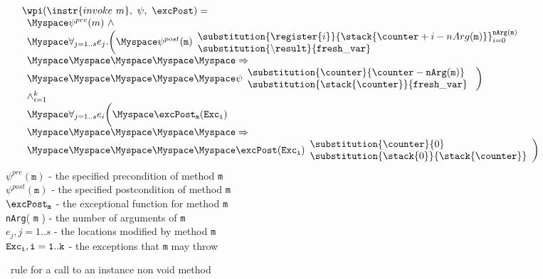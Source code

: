 \begin{figure}[!ht]
$$
\begin{array}{l}
\wpi(\instr{invoke \  m}, \ \psi ,\ \excPost) =\\ 
\begin{array}{l}
\Myspace \psi^{pre}(m) \ \wedge \\
\Myspace  \forall_{j = 1..s} e_{j}.\biggl( 
\Myspace \psi^{post}( \texttt{m}) 
                     \begin{array}{l}
                     \substitution{\register{i}}{\stack{\counter+i-nArg(\texttt{m}) }}_{i=0}^{\tt{nArg(m)}}  \\
                      \substitution{\tt{\backslash result} }{ fresh\_var } \\
                     \end{array} \\
  \Myspace\Myspace\Myspace\Myspace\Myspace                    \Rightarrow  \\
\Myspace\Myspace\Myspace\Myspace\Myspace   \psi  \begin{array}{l}
                             \substitution{\counter }{\counter - \tt{nArg}( \texttt{m} )} \\
                             \substitution{\stack{\counter } }{ \tt{fresh\_var}}  \   
                         \end{array}\biggr) \\
\wedge_{i = 1}^k\\
\Myspace \forall_{j = 1..s} e_i \biggl( 
\Myspace \excPost_{\tt{m} } ( \tt{Exc_i} ) \\
\Myspace\Myspace\Myspace\Myspace\Myspace \Rightarrow \\
\Myspace\Myspace\Myspace\Myspace\Myspace   \excPost(\tt{Exc_i} )
                                 \begin{array}{l}
                                       \substitution{ \counter}{  0} \\
                                        \substitution{\stack{0}}{ \stack{\counter}}   
              		\end{array}   \biggr)   \\
\end{array} \\[15 mm]
\end{array}
$$
$\psi^{pre}(\texttt{m})$ -  the specified  precondition of  method \texttt{m} \\
$\psi^{post}(\texttt{m})$ - the   specified   postcondition   of   method  \texttt{m}  \\
$\excPost_{\texttt{m}}$ - the   exceptional   function   for   method  \texttt{m}  \\
\texttt{nArg}( \texttt{m} ) -  the    number   of   arguments   of   \texttt{m} \\  
$e_{j} , j = 1 .. s$ - the   locations   modified   by   method   \texttt{m} \\
$\tt{Exc_i}, i = 1..k$ -  the   exceptions   that  \texttt{m} may  throw \\


\caption{\sc \wpi \ rule for a call to an instance non void method}
\label{wpInv}
\end{figure}
